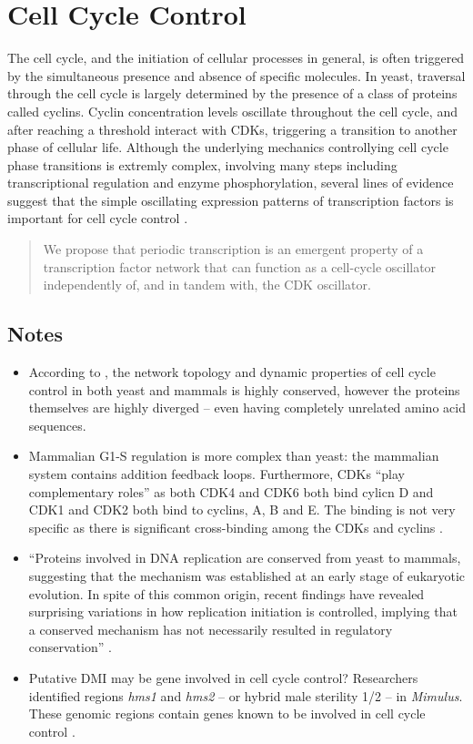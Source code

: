 \documentclass[11 pt]{article}
\begin{document}
    \section{Cell Cycle Control}
      The cell cycle, and the initiation of cellular processes in general, is often triggered by the simultaneous presence and absence of specific molecules. In yeast, traversal through the cell cycle is largely determined by the presence of a class of proteins called cyclins. Cyclin concentration levels oscillate throughout the cell cycle, and after reaching a threshold interact with CDKs, triggering a transition to another phase of cellular life. Although the underlying mechanics controllying cell cycle phase transitions is extremly complex, involving many steps including transcriptional regulation and enzyme phosphorylation, several lines of evidence suggest that the simple oscillating expression patterns of transcription factors is important for cell cycle control \citep{orlando2008global, simon2001serial}. 
      \begin{quote}
        We propose that periodic transcription is an emergent property of a transcription factor network that can function as a cell-cycle oscillator independently of, and in tandem with, the CDK oscillator. \citep{orlando2008global}
      \end{quote}

      \subsection{Notes}
      \begin{itemize}
        \item According to \citet{cross2011evolution}, the network topology and dynamic properties of cell cycle control in both yeast and mammals is highly conserved, however the proteins themselves are highly diverged -- even having completely unrelated amino acid sequences.
        \item Mammalian G1-S regulation is more complex than yeast: the mammalian system contains addition feedback loops. Furthermore, CDKs ``play complementary roles'' as both CDK4 and CDK6 both bind cylicn D and CDK1 and CDK2 both bind to cyclins, A, B and E. The binding is not very specific as there is significant cross-binding among the CDKs and cyclins \citep{cross2011evolution}.
        \item ``Proteins involved in DNA replication are conserved from yeast to mammals, suggesting that the mechanism was established at an early stage of eukaryotic evolution. In spite of this common origin, recent findings have revealed surprising variations in how replication initiation is controlled, implying that a conserved mechanism has not necessarily resulted in regulatory conservation'' \citep{kearsey2003enigmatic}.
        \item Putative DMI may be gene involved in cell cycle control? Researchers identified regions \emph{hms1} and \emph{hms2} -- or hybrid male sterility 1/2 -- in \emph{Mimulus}. These genomic regions contain genes known to be involved in cell cycle control \citep{sweigart2015evidence}.
      \end{itemize}
\end{document}
